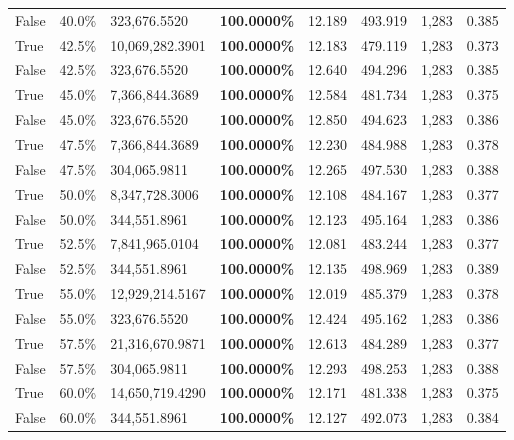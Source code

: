 \begin{table}[H]
\begin{tabular}{lllrllll}
\cline{1-8}
False & 40.0\% & 323,676.5520 & \bfseries \color{red} 100.0000\% & 12.189 & 493.919 & 1,283 & 0.385 \\
\cline{1-8}
True & 42.5\% & 10,069,282.3901 & \bfseries \color{red} 100.0000\% & 12.183 & 479.119 & 1,283 & 0.373 \\
\cline{1-8}
False & 42.5\% & 323,676.5520 & \bfseries \color{red} 100.0000\% & 12.640 & 494.296 & 1,283 & 0.385 \\
\cline{1-8}
True & 45.0\% & 7,366,844.3689 & \bfseries \color{red} 100.0000\% & 12.584 & 481.734 & 1,283 & 0.375 \\
\cline{1-8}
False & 45.0\% & 323,676.5520 & \bfseries \color{red} 100.0000\% & 12.850 & 494.623 & 1,283 & 0.386 \\
\cline{1-8}
True & 47.5\% & 7,366,844.3689 & \bfseries \color{red} 100.0000\% & 12.230 & 484.988 & 1,283 & 0.378 \\
\cline{1-8}
False & 47.5\% & \color{red} 304,065.9811 & \bfseries \color{red} 100.0000\% & 12.265 & 497.530 & 1,283 & 0.388 \\
\cline{1-8}
True & 50.0\% & 8,347,728.3006 & \bfseries \color{red} 100.0000\% & 12.108 & 484.167 & 1,283 & 0.377 \\
\cline{1-8}
False & 50.0\% & 344,551.8961 & \bfseries \color{red} 100.0000\% & 12.123 & 495.164 & 1,283 & 0.386 \\
\cline{1-8}
True & 52.5\% & 7,841,965.0104 & \bfseries \color{red} 100.0000\% & 12.081 & 483.244 & 1,283 & 0.377 \\
\cline{1-8}
False & 52.5\% & 344,551.8961 & \bfseries \color{red} 100.0000\% & 12.135 & 498.969 & 1,283 & 0.389 \\
\cline{1-8}
True & 55.0\% & 12,929,214.5167 & \bfseries \color{red} 100.0000\% & 12.019 & 485.379 & 1,283 & 0.378 \\
\cline{1-8}
False & 55.0\% & 323,676.5520 & \bfseries \color{red} 100.0000\% & 12.424 & 495.162 & 1,283 & 0.386 \\
\cline{1-8}
True & 57.5\% & 21,316,670.9871 & \bfseries \color{red} 100.0000\% & 12.613 & 484.289 & 1,283 & 0.377 \\
\cline{1-8}
False & 57.5\% & \color{red} 304,065.9811 & \bfseries \color{red} 100.0000\% & 12.293 & 498.253 & 1,283 & 0.388 \\
\cline{1-8}
True & 60.0\% & 14,650,719.4290 & \bfseries \color{red} 100.0000\% & 12.171 & 481.338 & 1,283 & 0.375 \\
\cline{1-8}
False & 60.0\% & 344,551.8961 & \bfseries \color{red} 100.0000\% & 12.127 & 492.073 & 1,283 & 0.384 \\

\end{tabular}
\end{table}
